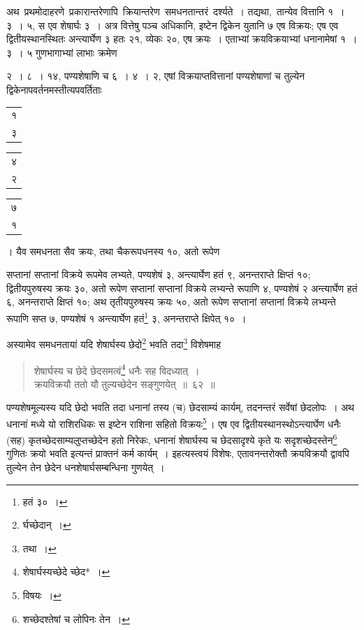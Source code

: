 \documentclass[10pt, openany]{book}
\begin{document}
{{{अथ \,प्रथमोदाहरणे \,प्रकारान्तरेणापि \,क्रियान्तरेण \,समधनतान्तरं \,दर्श्यते~।
तद्यथा, \,तान्येव वित्तानि १~। ३~। ५, स एव शेषार्घः ३~। अत्र वित्तेषु पञ्च
अधिकानि, इष्टेन}
{द्विकेन युतानि ७ एष विक्रयः; एष एव द्वितीयस्थानस्थितः अन्त्यार्घेण ३
हतः २१, व्येकः}
{२०, एष क्रयः~। एताभ्यां क्रयविक्रयाभ्यां धनानामेषां १~। ३~। ५
गुणभागाभ्यां लाभाः क्रमेण}
{२~। ८~। १४, पण्यशेषाणि च ६~। ४~। २, एषां विक्रयाप्तवित्तानां पण्यशेषाणां च
तुल्येन द्विकेनापवर्तनमस्तीत्यपवर्तिताः\begin{tabular}{r|}१\\ ३\end{tabular}\begin{tabular}{r|}४\\ २\end{tabular} \begin{tabular}{r}७ \\१ \end{tabular}। यैव समधनता सैव क्रयः, तथा
चैकरूपधनस्य १०, अतो रूपेण}
{सप्तानां सप्तानां विक्रये रूपमेव लभ्यते, पण्यशेषं ३, अन्त्यार्घेण हतं
९, अनन्तराप्ते क्षिप्तं १०;}
{द्वितीयपुरुषस्य क्रयः ३०, अतो रूपेण सप्तानां सप्तानां विक्रये लभ्यन्ते
रूपाणि ४, पण्यशेषं २}
{अन्त्यार्घेण हतं ६, अनन्तराप्ते क्षिप्तं १०; अथ तृतीयपुरुषस्य क्रयः ५०,
अतो रूपेण सप्तानां}
{सप्तानां विक्रये लभ्यन्ते रूपाणि सप्त ७, पण्यशेषं १ अन्त्यार्घेण
हतं\renewcommand{\thefootnote}{\s १}\footnote{\s हतं ३०~।}  ३, अनन्तराप्ते क्षिपेत् १०~।}
\vspace{3mm}

{अस्यामेव समधनतायां यदि शेषार्घस्य छेदो\renewcommand{\thefootnote}{\s २}\footnote{\s *र्घच्छेदान्~।} भवति तदा\renewcommand{\thefootnote}{\s ३}\footnote{\s तथा~।} विशेषमाह\textemdash}

\begin{quote}
    
{\bs  शेषार्घस्य च छेदे छेदसमत्वं\renewcommand{\thefootnote}{\s ४}\footnote{\s शेषार्घस्यच्छेदे च्छेद*~।} धनैः सह विदध्यात्~। \\
 क्रयविक्रयौ ततो यौ तुल्यच्छेदेन सङ्गुणयेत्~॥~६२~॥}\end{quote}

{पण्यशेषमूल्यस्य यदि छेदो भवति तदा धनानां तस्य (च) छेदसाम्यं कार्यम्,
तदनन्तरं}
{सर्वेषां छेदलोपः~। अथ धनानां मध्ये यो राशिरधिकः स इष्टेन राशिना सहितो
विक्रयः\renewcommand{\thefootnote}{\s ५}\footnote{\s विषयः~।}\,।}
{एष एव द्वितीयस्थानस्थोऽन्त्यार्घेण धनैः (सह) कृतच्छेदसाम्यलुप्तच्छेदेन
हतो निरेकः, धनानां}
{शेषार्घस्य च छेदसादृश्ये कृते यः सदृशच्छेदस्तेन\renewcommand{\thefootnote}{\s ६}\footnote{\s *शच्छेदश्तेषां च लोपिनः तेन~।} गुणितः क्रयो भवति
इत्यन्तं प्राक्तनं कर्म}
{कार्यम्~। इहत्यस्त्वयं विशेषः, एतावनन्तरोक्तौ क्रयविक्रयौ द्वावपि
तुल्येन तेन छेदेन धनशेषार्घसम्बन्धिना गुणयेत्~। }

}}
\end{document}

